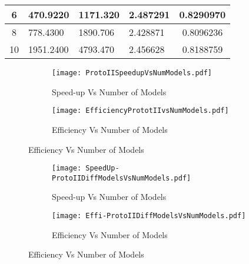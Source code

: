 \begin{table}[]
\begin{tabular}{|c|l|l|l|c|}
6                                                                                                                            & 470.9220                                                                                                                                                                  & 1171.320                                                                                                                                   & 2.487291                               & 0.8290970           \\ \hline
8                                                                                                                            & 778.4300                                                                                                                                                                  & 1890.706                                                                                                                                   & 2.428871                               & 0.8096236           \\ \hline
10                                                                                                                           & 1951.2400                                                                                                                                                                 & 4793.470                                                                                                                                   & 2.456628                               & 0.8188759           \\ \hline
\end{tabular}
\end{table}

\begin{figure}
\centering
\captionsetup[subfigure]{labelformat=empty}
\begin{subfigure}
\centering
\texttt{[image: ProtoIISpeedupVsNumModels.pdf]}
\caption{Speed-up Vs Number of Models}
\label{fig:ProtoIISpeedupVsNumModels}
\end{subfigure}
\begin{subfigure}
\centering
\texttt{[image: EfficiencyPrototIIvsNumModels.pdf]}
\caption{Efficiency Vs Number of Models}
\label{EfficiencyPrototIIvsNumModels}
\end{subfigure}
\end{figure}


\begin{figure}
\centering
\captionsetup[subfigure]{labelformat=empty}
\begin{subfigure}
\centering
\texttt{[image: SpeedUp-ProtoIIDiffModelsVsNumModels.pdf]}
\caption{Speed-up Vs Number of Models}
\label{fig:SpeedUp-ProtoIIDiffModelsVsNumModels}
\end{subfigure}
\begin{subfigure}
\centering
\texttt{[image: Effi-ProtoIIDiffModelsVsNumModels.pdf]}
\caption{Efficiency Vs Number of Models}
\label{Effi-ProtoIIDiffModelsVsNumModels}
\end{subfigure}
\end{figure}


